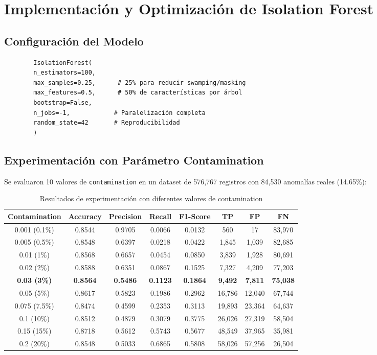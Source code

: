 \documentclass[12pt]{article}
\begin{document}
	\section{Implementación y Optimización de Isolation Forest}
	
	\subsection{Configuración del Modelo}
	
	\begin{verbatim}
		IsolationForest(
		n_estimators=100,
		max_samples=0.25,      # 25% para reducir swamping/masking
		max_features=0.5,      # 50% de características por árbol
		bootstrap=False,
		n_jobs=-1,            # Paralelización completa
		random_state=42       # Reproducibilidad
		)
	\end{verbatim}
	
	\subsection{Experimentación con Parámetro Contamination}
	
	Se evaluaron 10 valores de \texttt{contamination} en un dataset de 576,767 registros con 84,530 anomalías reales (14.65\%):
	
	\begin{table}[htbp]
		\centering
		\caption{Resultados de experimentación con diferentes valores de contamination}
		\label{tab:contamination-results}
		\begin{tabular}{|c|c|c|c|c|c|c|c|}
			\hline
			\textbf{Contamination} & \textbf{Accuracy} & \textbf{Precision} & \textbf{Recall} & \textbf{F1-Score} & \textbf{TP} & \textbf{FP} & \textbf{FN} \\
			\hline
			0.001 (0.1\%) & 0.8544 & 0.9705 & 0.0066 & 0.0132 & 560 & 17 & 83,970 \\
			\hline
			0.005 (0.5\%) & 0.8548 & 0.6397 & 0.0218 & 0.0422 & 1,845 & 1,039 & 82,685 \\
			\hline
			0.01 (1\%) & 0.8568 & 0.6657 & 0.0454 & 0.0850 & 3,839 & 1,928 & 80,691 \\
			\hline
			0.02 (2\%) & 0.8588 & 0.6351 & 0.0867 & 0.1525 & 7,327 & 4,209 & 77,203 \\
			\hline
			\textbf{0.03 (3\%)} & \textbf{0.8564} & \textbf{0.5486} & \textbf{0.1123} & \textbf{0.1864} & \textbf{9,492} & \textbf{7,811} & \textbf{75,038} \\
			\hline
			0.05 (5\%) & 0.8617 & 0.5823 & 0.1986 & 0.2962 & 16,786 & 12,040 & 67,744 \\
			\hline
			0.075 (7.5\%) & 0.8474 & 0.4599 & 0.2353 & 0.3113 & 19,893 & 23,364 & 64,637 \\
			\hline
			0.1 (10\%) & 0.8512 & 0.4879 & 0.3079 & 0.3775 & 26,026 & 27,319 & 58,504 \\
			\hline
			0.15 (15\%) & 0.8718 & 0.5612 & 0.5743 & 0.5677 & 48,549 & 37,965 & 35,981 \\
			\hline
			0.2 (20\%) & 0.8548 & 0.5033 & 0.6865 & 0.5808 & 58,026 & 57,256 & 26,504 \\
			\hline
		\end{tabular}
	\end{table}
	
\end{document}
